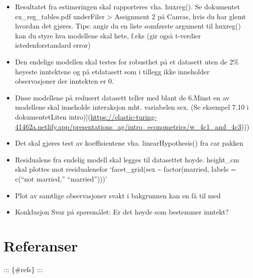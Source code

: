 \documentclass[
  12pt,
  norsk,
]{article}
\begin{document}
\begin{itemize}
\item
  Resultatet fra estimeringen skal rapporteres vha. huxreg(). Se
  dokumentet ex\_reg\_tables.pdf underFiler \textgreater{} Assignment 2
  på Canvas, hvis du har glemt hvordan det gjøres. Tips: angir du en
  liste somførste argument til huxreg() kan du styre hva modellene skal
  hete, f.eks (gir også t-verdier istedenforstandard error)
\item
  Den endelige modellen skal testes for robusthet på et datasett uten de
  2\% høyeste inntektene og på etdatasett som i tillegg ikke inneholder
  observasjoner der inntekten er 0.
\item
  Disse modellene på redusert datasett teller med blant de 6.Minst en av
  modellene skal inneholde interaksjon mht. variabelen sex. (Se eksempel
  7.10 i dokumentetLiten
  intro){]}(\url{https://elastic-turing-41462a.netlify.app/presentations_ag/intro_econometrics/w_4c1_and_4c3})))
\item
  Det skal gjøres test av koeffisientene vha. linearHypothesis() fra car
  pakken
\item
  Residualene fra endelig modell skal legges til datasettet hoyde.
  height\_cm skal plottes mot residualenefor `facet\_grid(sex
  \textasciitilde{} factor(married, labels = c(``not married,''
  ``married'')))'
\item
  Plot av samtlige observasjoner svakt i bakgrunnen kan en få til med
\item
  Konklusjon Svar på spørsmålet: Er det høyde som bestemmer inntekt?
\end{itemize}

\hypertarget{referanser}{%
\section{Referanser}\label{referanser}}

::: \{\#refs\} :::
\end{document}

